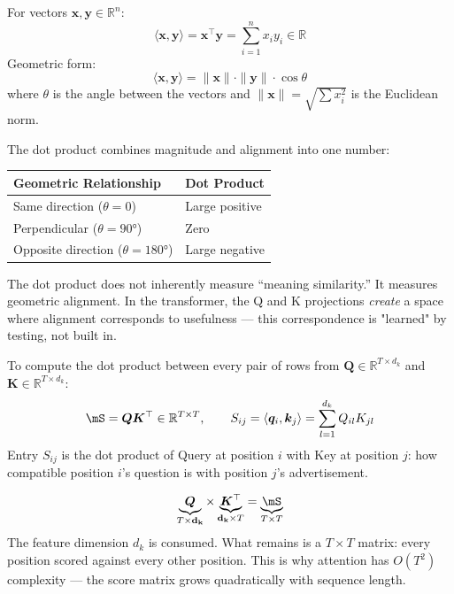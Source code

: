 \documentclass[11pt, a4paper]{article}
\newcommand{\R}{\mathbb{R}}
\newcommand{\vx}{\bm{x}}
\newcommand{\vq}{\bm{q}}
\newcommand{\vk}{\bm{k}}
\newcommand{\mQ}{\bm{Q}}
\newcommand{\mK}{\bm{K}}
\begin{document}
\begin{formaldef}
For vectors $\vx, \bm{y} \in \R^n$:
\[
\langle \vx, \bm{y} \rangle = \vx^\top \bm{y} = \sum_{i=1}^{n} x_i y_i \in \R
\]
Geometric form:
\[
\langle \vx, \bm{y} \rangle = \|\vx\| \cdot \|\bm{y}\| \cdot \cos\theta
\]
where $\theta$ is the angle between the vectors and $\|\vx\| = \sqrt{\sum x_i^2}$ is the Euclidean norm.
\end{formaldef}

\begin{intuition}
The dot product combines magnitude and alignment into one number:
\begin{center}
\begin{tabular}{@{}ll@{}}
\toprule
\textbf{Geometric Relationship} & \textbf{Dot Product} \\
\midrule
Same direction ($\theta = 0$) & Large positive \\
Perpendicular ($\theta = 90°$) & Zero \\
Opposite direction ($\theta = 180°$) & Large negative \\
\bottomrule
\end{tabular}
\end{center}
The dot product does not inherently measure ``meaning similarity.''
It measures geometric alignment. In the transformer, the Q and K projections
\textit{create} a space where alignment corresponds to usefulness --- this
correspondence is "learned" by testing, not built in.
\end{intuition}

\begin{formaldef}
To compute the dot product between every pair of rows from $\mQ \in \R^{T \times d_k}$
and $\mK \in \R^{T \times d_k}$:
\[
\mS = \mQ \mK^\top \in \R^{T \times T}, \qquad S_{ij} = \langle \vq_i, \vk_j \rangle = \sum_{l=1}^{d_k} Q_{il} K_{jl}
\]
Entry $S_{ij}$ is the dot product of Query at position $i$ with Key at position $j$:
how compatible position $i$'s question is with position $j$'s advertisement.
\end{formaldef}

\begin{dimcheck}
\[
\underbrace{\mQ}_{T \times \mathbf{d_k}} \times \underbrace{\mK^\top}_{\mathbf{d_k} \times T} = \underbrace{\mS}_{T \times T}
\]
The feature dimension $d_k$ is consumed. What remains is a $T \times T$ matrix:
every position scored against every other position. This is why attention has
$O(T^2)$ complexity --- the score matrix grows quadratically with sequence length.
\end{dimcheck}
\end{document}
